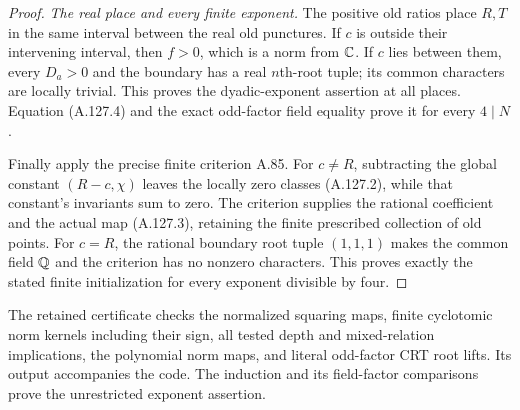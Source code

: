 \begin{proof}
\emph{The real place and every finite exponent.}
The positive old ratios place $R,T$ in the same
interval between the real old punctures.
If $c$ is outside their intervening interval,
then $f>0$, which is a norm from $\mathbb C$.
If $c$ lies between them, every $D_a>0$ and
the boundary has a real $n$th-root tuple;
its common characters are locally trivial.
This proves the dyadic-exponent assertion at
all places.
Equation (A.127.4) and the exact odd-factor
field equality prove it for every $4\mid N$.

Finally apply the precise finite criterion A.85.
For $c\ne R$, subtracting the global constant
$(R-c,\chi)$ leaves the locally zero classes
(A.127.2), while that constant's invariants
sum to zero.
The criterion supplies the rational coefficient
and the actual map (A.127.3), retaining the
finite prescribed collection of old points.
For $c=R$, the rational boundary root tuple
$(1,1,1)$ makes the common field $\mathbb Q$ and the
criterion has no nonzero characters.
This proves exactly the stated finite
initialization for every exponent divisible
by four.
\end{proof}

The retained certificate
checks the normalized squaring maps, finite
cyclotomic norm kernels including their sign,
all tested depth and mixed-relation implications,
the polynomial norm maps, and literal odd-factor
CRT root lifts.
Its output accompanies the code.
The induction and its field-factor comparisons
prove the unrestricted exponent assertion.

